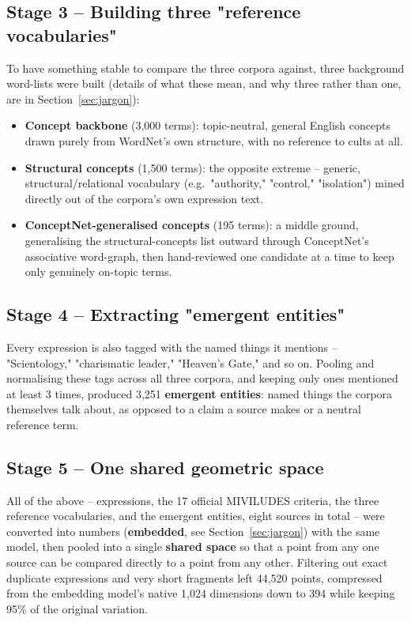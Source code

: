 \documentclass[11pt,a4paper]{article}
\newcommand{\jargon}[1]{\textbf{#1}}
\begin{document}
\subsection{Stage 3 -- Building three "reference vocabularies"}
To have something stable to compare the three corpora against, three
background word-lists were built (details of what these mean, and why
three rather than one, are in Section~\ref{sec:jargon}):
\begin{itemize}[leftmargin=1.4em]
  \item \textbf{Concept backbone} (3,000 terms): topic-neutral, general
  English concepts drawn purely from WordNet's own structure, with no
  reference to cults at all.
  \item \textbf{Structural concepts} (1,500 terms): the opposite
  extreme -- generic, structural/relational vocabulary (e.g.\
  "authority," "control," "isolation") mined directly out of the
  corpora's own expression text.
  \item \textbf{ConceptNet-generalised concepts} (195 terms): a
  middle ground, generalising the structural-concepts list outward
  through ConceptNet's associative word-graph, then hand-reviewed one
  candidate at a time to keep only genuinely on-topic terms.
\end{itemize}

\subsection{Stage 4 -- Extracting "emergent entities"}
Every expression is also tagged with the named things it mentions --
"Scientology," "charismatic leader," "Heaven's Gate," and so on. Pooling
and normalising these tags across all three corpora, and keeping only
ones mentioned at least 3 times, produced 3,251 \jargon{emergent
entities}: named things the corpora themselves talk about, as opposed to
a claim a source makes or a neutral reference term.

\subsection{Stage 5 -- One shared geometric space}
All of the above -- expressions, the 17 official MIVILUDES criteria, the
three reference vocabularies, and the emergent entities, eight sources
in total -- were converted into numbers (\jargon{embedded}, see
Section~\ref{sec:jargon}) with the same model, then pooled into a single
\jargon{shared space} so that a point from any one source can be
compared directly to a point from any other. Filtering out exact
duplicate expressions and very short fragments left 44,520 points,
compressed from the embedding model's native 1,024 dimensions down to
394 while keeping 95\% of the original variation.
\end{document}
